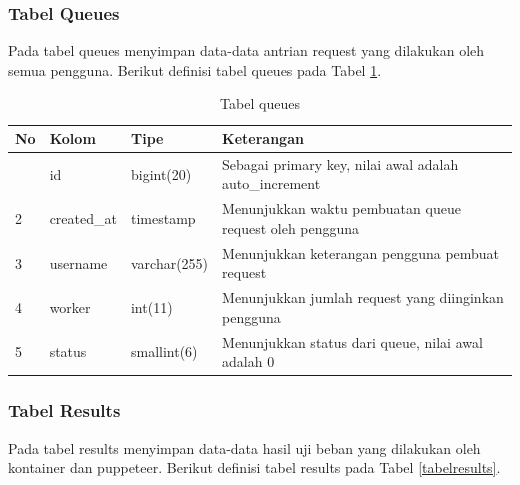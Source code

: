 			\subsubsection{Tabel Queues}
				Pada tabel queues menyimpan data-data antrian request yang dilakukan oleh semua pengguna. Berikut definisi tabel queues pada Tabel \ref{tabelqueues}.
			
				\begin{longtable}{|p{}|p{}|p{}|p{}|}
					\caption{Tabel queues} \label{tabelqueues} \\
					\hline
					\textbf{No} & \textbf{Kolom} & \textbf{Tipe} & \textbf{Keterangan} \\ \hline
					\endhead
					\endfoot
					\endlastfoot
					1 & id & bigint(20) & Sebagai primary key, nilai awal adalah auto\_increment \\ \hline
					2 & created\_at & timestamp & Menunjukkan waktu pembuatan queue request oleh pengguna \\ \hline
					3 & username & varchar(255) & Menunjukkan keterangan pengguna pembuat request \\ \hline
					4 & worker & int(11) & Menunjukkan jumlah request yang diinginkan pengguna \\ \hline
					5 & status & smallint(6) & Menunjukkan status dari queue, nilai awal adalah 0 \\ \hline
				\end{longtable}
		
			\subsubsection{Tabel Results}
				Pada tabel results menyimpan data-data hasil uji beban yang dilakukan oleh kontainer dan puppeteer. Berikut definisi tabel results pada Tabel \ref{tabelresults}.
				
